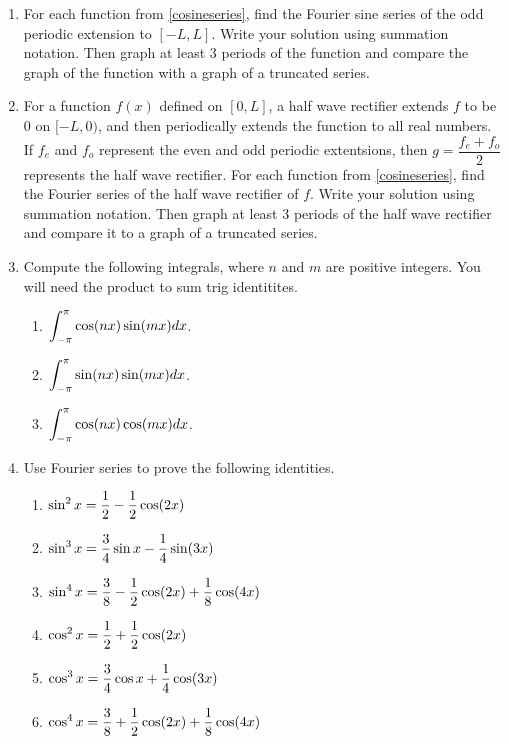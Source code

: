 \begin{enumerate}
\begin{multicols}{2}
\begin{enumerate}
\end{enumerate}
	\end{multicols}
	
	
	\item For each function from \ref{cosineseries}, find the Fourier sine series of the odd periodic extension to $[-L,L]$. Write your solution using summation notation. Then graph at least 3 periods of the function and compare the graph of the function with a graph of a truncated series.
	
	
	\item For a function $f(x)$ defined on $[0,L]$, a half wave rectifier extends $f$ to be $0$ on $[-L,0)$, and then periodically extends the function to all real numbers. If $f_e$ and $f_o$ represent the even and odd periodic extentsions, then $g=\dfrac{f_e+f_o}{2}$ represents the half wave rectifier. For each function from \ref{cosineseries}, find the Fourier series of the half wave rectifier of $f$. Write your solution using summation notation. Then graph at least 3 periods of the half wave rectifier and compare it to a graph of a truncated series. 

	\item Compute the following integrals, where $n$ and $m$ are positive integers. You will need the product to sum trig identitites.
	
\begin{enumerate}
	\item $\displaystyle \int_{-\pi}^{\pi} \cos(nx)\sin(mx)dx$.
	\item $\displaystyle \int_{-\pi}^{\pi} \sin(nx)\sin(mx)dx$.
	\item $\displaystyle \int_{-\pi}^{\pi} \cos(nx)\cos(mx)dx$.	
\end{enumerate}


\item Use Fourier series to prove the following identities.
\begin{multicols}{2}
\begin{enumerate}
	\item $\displaystyle \sin^2x = \frac12 -\frac12 \cos(2x)$
	\item $\displaystyle \sin^3x = \frac34\sin x -\frac14 \sin(3x)$
	\item $\displaystyle \sin^4x = \frac38-\frac12\cos(2x) +\frac18 \cos(4x)$
	\item $\displaystyle \cos^2x = \frac12 +\frac12 \cos(2x)$
	\item $\displaystyle \cos^3x = \frac34\cos x +\frac14 \cos(3x)$
	\item $\displaystyle \cos^4x = \frac38+\frac12\cos(2x) +\frac18 \cos(4x)$
\end{enumerate}
\end{multicols}


\end{enumerate}
